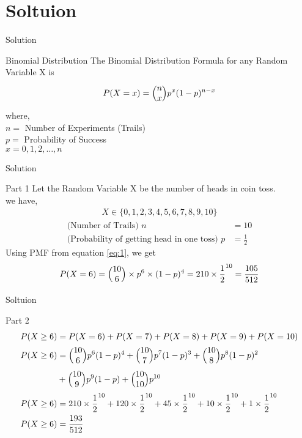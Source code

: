 \documentclass{beamer}
\makeatletter
\newcommand{\mybinom}[2]{\Bigl(\begin{array}{@{}c@{}}#1\\#2\end{array}\Bigr)}
\makeatother
\begin{document}
\section{Soltuion}
\begin{frame}{Solution}
    \begin{alertblock}{Binomial Distribution}
        The Binomial Distribution Formula for any Random Variable X is 
        \begin{equation}
            P(X = x) = \mybinom{n}{x}p^x(1-p)^{n-x} \label{eq:1}
        \end{equation}
        where,\\
        $n = $ Number of Experiments (Trails) \\
        $p = $ Probability of Success \\
        $x = 0,1,2,\ldots,n$
    \end{alertblock}
\end{frame}
\begin{frame}{Solution}
    \begin{block}{Part 1}
        Let the Random Variable X be the number of heads in coin toss.\\
        we have,
        \begin{align}
            X \in \{0,1,2,3,4,5,6,7,8,9,10\}
        \end{align}
        \begin{align}
            \text{(Number of Trails) } n &= 10\\
            \text{(Probability of getting head in one toss) } p &= \frac{1}{2}
        \end{align}
        Using PMF from equation \eqref{eq:1}, we get
        \begin{align}
            P(X=6) = \mybinom{10}{6}\times p^6\times (1-p)^4 = 210\times \frac{1}{2}^{10}= \frac{105}{512}
        \end{align}
    \end{block}
\end{frame} 
\begin{frame}{Soltuion}
    \begin{block}{Part 2}
        \begin{align}
            P(X \geq 6) &= P(X = 6)+P(X = 7)+P(X = 8)+P(X = 9)+P(X =10)\\
            P(X \geq 6) &= \mybinom{10}{6} p^6(1-p)^4 + \mybinom{10}{7}p^7(1-p)^3 + \mybinom{10}{8}p^8(1-p)^2 \\ 
            & +\mybinom{10}{9}p^9(1-p)+\mybinom{10}{10}p^{10}\\
            P(X \geq 6) &= 210\times \frac{1}{2}^{10}+120\times \frac{1}{2}^{10}+45\times \frac{1}{2}^{10}+10\times \frac{1}{2}^{10}+1\times \frac{1}{2}^{10}\\
            P(X \geq 6) &=\frac{193}{512}
        \end{align}
    \end{block}  
\end{frame}
\end{document}
